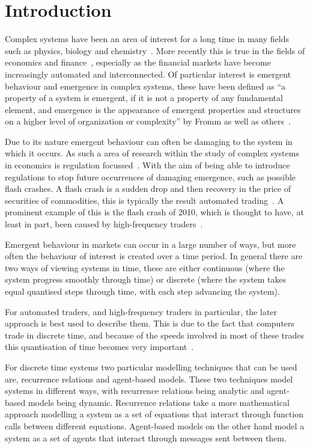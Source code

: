 \documentclass{article}
\begin{document}
\section{Introduction}
Complex systems have been an area of interest for a long time in many  fields such as physics, biology and chemistry~\cite{oldcps}. More recently this is true in the fields of economics and finance~\cite{complexecon}, especially as the financial markets have become increasingly automated and interconnected. Of particular interest is emergent behaviour and emergence in complex systems, these have been defined as ``a property of a system is emergent, if it is not a property of any fundamental element, and emergence is the appearance of emergent properties and structures on a higher level of organization or complexity'' by Fromm as well as others~\cite{bubblesandcrashes, emergdef, emegdefs2}.

Due to its nature emergent behaviour can often be damaging to the system in which it occurs. As such a area of research within the study of complex systems in economics is regulation focussed~\cite{regemergnce}. With the aim of being able to introduce regulations to stop future occurrences of damaging emergence, such as possible flash crashes. A flash crash is a sudden drop and then recovery in the price of securities of commodities, this is typically the result automated trading~\cite{flashauto}. A prominent example of this is the flash crash of 2010, which is thought to have, at least in part, been caused by high-frequency traders~\cite{SECreport_delays, DynamicCoupling_Chris}. 

Emergent behaviour in markets can occur in a large number of ways, but more often the behaviour of interest is created over a time period. In general there are two ways of viewing systems in time, these are either continuous (where the system progress smoothly through time) or discrete (where the system takes equal quantised steps through time, with each step advancing the system).

For automated traders, and high-frequency traders in particular, the later approach is best used to describe them. This is due to the fact that computers trade in discrete time, and because of the speeds involved in most of these trades this quantisation of time becomes very important~\cite{discretetiem}. 

For discrete time systems two particular modelling techniques that can be used are, recurrence relations and agent-based models. These two techniques model systems in different ways, with recurrence relations being analytic and agent-based models being dynamic. Recurrence relations take a more mathematical approach modelling a system as a set of equations that interact through function calls between different equations. Agent-based models on the other hand model a system as a set of agents that interact through messages sent between them.    
\end{document}
